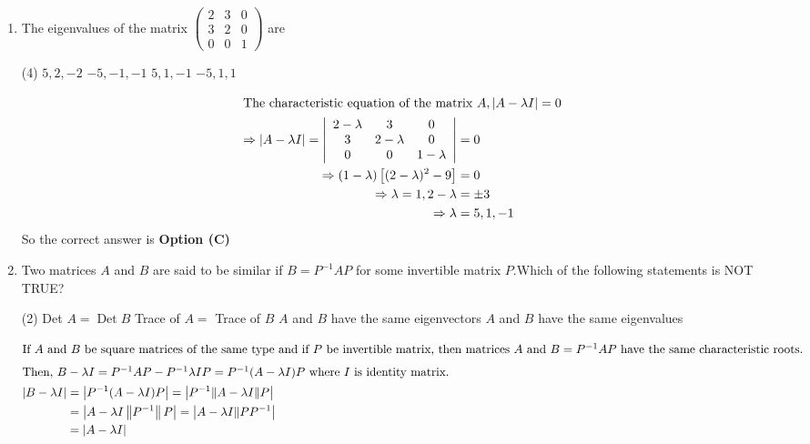 \begin{enumerate}[label=\color{ocre}\textbf{\arabic*.}]
	\item The eigenvalues of the matrix $\left(\begin{array}{lll}2 & 3 & 0 \\ 3 & 2 & 0 \\ 0 & 0 & 1\end{array}\right)$ are
	{}
	\begin{tasks}(4)
		\task[\textbf{A.}] $5,2,-2$
		\task[\textbf{B.}] $-5,-1,-1$
		\task[\textbf{C.}]  $5,1,-1$
		\task[\textbf{D.}] $-5,1,1$
	\end{tasks}
	\begin{answer}
		\begin{align*}
		\intertext{The characteristic equation of the matrix $A,|A-\lambda I|=0$}
		\Rightarrow|A-\lambda I|=\left|\begin{array}{ccc}2-\lambda & 3 & 0 \\ 3 & 2-\lambda & 0 \\ 0 & 0 & 1-\lambda\end{array}\right|&=0 \\\Rightarrow(1-\lambda)\left[(2-\lambda)^{2}-9\right]&=0 \\\Rightarrow \lambda=1,2-\lambda&=\pm 3\\
		\Rightarrow \lambda&=5,1,-1
		\end{align*}
		So the correct answer is \textbf{Option (C)}
	\end{answer}
	\item Two matrices $A$ and $B$ are said to be similar if $B=P^{-1} A P$ for some invertible matrix $P$.Which of the following statements is NOT TRUE?
	{}
	\begin{tasks}(2)
		\task[\textbf{A.}] Det $A=\operatorname{Det} B$
		\task[\textbf{B.}]  Trace of $A=$ Trace of $B$
		\task[\textbf{C.}] $A$ and $B$ have the same eigenvectors
		\task[\textbf{D.}] $A$ and $B$ have the same eigenvalues
	\end{tasks}
	\begin{answer}
		\begin{align*}
		\intertext{If $A$ and $B$ be square matrices of the same type and if $P$ be invertible matrix, then matrices $A$ and $B=P^{-1} A P$ have the same characteristic roots.}
		\intertext{Then, $B-\lambda I=P^{-1} A P-P^{-1} \lambda I P=P^{-1}(A-\lambda I) P$ where $I$ is identity matrix.}
		|B-\lambda I|&=\left|P^{-1}(A-\lambda I) P\right|=\left|P^{-1}\|A-\lambda I\| P\right|\\&=\left|A-\lambda I\left\|P^{-1}\right\| P\right|=\left|A-\lambda I \| P P^{-1}\right|\\&=|A-\lambda I|

\end{align*}
\end{answer}
\end{enumerate}

